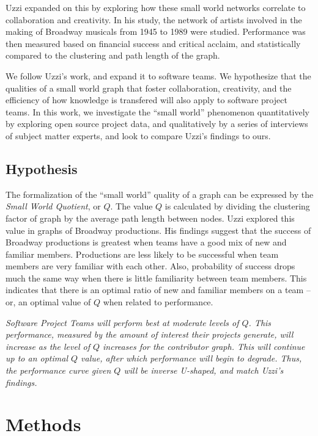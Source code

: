 \documentclass{proc}
\begin{document}
Uzzi \cite{uzzi2005collaboration} expanded on this by exploring how these small world networks correlate to collaboration and creativity. In his study, the network of artists involved in the making of Broadway musicals from 1945 to 1989 were studied. Performance was then measured based on financial success and critical acclaim, and statistically compared to the clustering and path length of the graph.

We follow Uzzi's work, and expand it to software teams. We hypothesize that the qualities of a small world graph that foster collaboration, creativity, and the efficiency of how knowledge is transfered\cite{latora2001efficient} will also apply to software project teams. In this work, we investigate the ``small world'' phenomenon quantitatively by exploring open source project data, and qualitatively by a series of interviews of subject matter experts, and look to compare Uzzi's findings to ours.

\subsection{Hypothesis}
The formalization of the ``small world'' quality of a graph can be expressed by the \textit{Small World Quotient}, or $Q$\cite{watts1999small,watts1998collective}. The value $Q$ is calculated by dividing the clustering factor of graph by the average path length between nodes. Uzzi explored this value in graphs of Broadway productions\cite{uzzi2005collaboration}. His findings suggest that the success of Broadway productions is greatest when teams have a good mix of new and familiar members. Productions are less likely to be successful when team members are very familiar with each other. Also, probability of success drops much the same way when there is little familiarity between team members. This indicates that there is an optimal ratio of new and familiar members on a team -- or, an optimal value of $Q$ when related to performance.

\textit{Software Project Teams will perform best at moderate levels of $Q$. This performance, measured by the amount of interest their projects generate, will increase as the level of $Q$ increases for the contributor graph. This will continue up to an optimal $Q$ value, after which performance will begin to degrade. Thus, the performance curve given $Q$ will be inverse U-shaped, and match Uzzi's findings\cite{uzzi2005collaboration}.}

\section{Methods}
\end{document}
